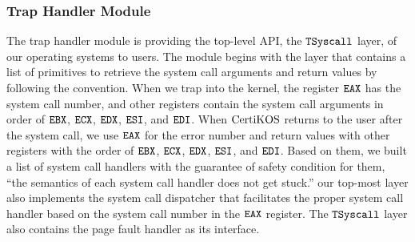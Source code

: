 \subsubsection{Trap Handler Module}
The trap handler module is providing the top-level API, the ${\mathrm{\texttt{TSyscall}}}$ layer, of our operating systems to users.  
The module begins with the layer that contains a list of primitives to retrieve the system call arguments and return values
by following the convention.
When we trap into the kernel, the register ${\mathrm{\texttt{EAX}}}$ has the system call number, and other registers contain the system call arguments in order of ${\mathrm{\texttt{EBX}}}$, ${\mathrm{\texttt{ECX}}}$, ${\mathrm{\texttt{EDX}}}$, ${\mathrm{\texttt{ESI}}}$, and ${\mathrm{\texttt{EDI}}}$. 
When $\mathrm{CertiKOS}$ returns to the user after the system call, we use ${\mathrm{\texttt{EAX}}}$ for the error number and 
return values with other registers with the order of 
 ${\mathrm{\texttt{EBX}}}$, ${\mathrm{\texttt{ECX}}}$, ${\mathrm{\texttt{EDX}}}$, ${\mathrm{\texttt{ESI}}}$, and ${\mathrm{\texttt{EDI}}}$. 
Based on them, 
we built a list of system call handlers with the guarantee of safety condition for them, 
``the semantics of each system call handler does not get stuck.'' 
our top-most layer also implements the system call dispatcher that facilitates the proper system call handler based on the system call number in the ${\mathrm{\texttt{EAX}}}$ register.
The ${\mathrm{\texttt{TSyscall}}}$ layer also contains the page fault handler as its interface.

